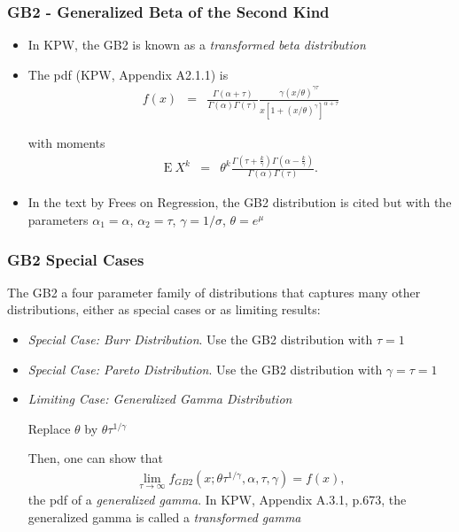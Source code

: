 \documentclass{beamer}
\begin{document}
\begin{frame}[shrink=2]
\frametitle{GB2 - Generalized Beta of the Second Kind}
\begin{itemize}
\item In KPW, the GB2 is known as a \textit{transformed beta
distribution} \vspace{2mm}

\item The pdf (KPW, Appendix A2.1.1) is
\begin{eqnarray*}
f(x) &=& \frac{\Gamma(\alpha + \tau)}{\Gamma(\alpha)\Gamma(\tau)}
   \frac{\gamma (x/\theta)^{\gamma \tau}}
   {x\left[1+(x/\theta)^{\gamma}\right]^{\alpha + \tau}}
\end{eqnarray*} \vspace{2mm}

with moments
\begin{eqnarray*}
\mathrm{E~}X^k &=& \theta^k \frac{\Gamma(\tau + \frac{k}{\gamma})\Gamma(\alpha-\frac{k}{\gamma})}{\Gamma(\alpha)\Gamma(\tau)} .
\end{eqnarray*} \vspace{2mm}

\item In the text by Frees on Regression, the GB2 distribution is cited but with the parameters
$\alpha_1  = \alpha$, $\alpha_2  =\tau$, $\gamma = 1/\sigma$,
$\theta = e^\mu$
\end{itemize}
\end{frame}

\begin{frame}[shrink=2]
\frametitle{GB2 Special Cases} The GB2 a four parameter family of
distributions that captures many other distributions, either as
special cases or as limiting results: \vspace{2mm}

\begin{itemize}
\item \textit{Special Case: Burr Distribution}. Use the GB2 distribution with $\tau =
1$ \vspace{2mm}

\item \textit{Special Case: Pareto Distribution}. Use the GB2 distribution with $\gamma=\tau =
1$ \vspace{2mm}

\item \textit{Limiting Case: Generalized Gamma Distribution} \vspace{2mm}

Replace $\theta$ by $\theta \tau^{1/\gamma}$ \vspace{2mm}

Then, one can show that
\begin{eqnarray*}
\lim_{\tau \to \infty} f_{GB2}(x; \theta \tau^{1/\gamma}, \alpha, \tau, \gamma) = f(x),
\end{eqnarray*}
the pdf of a \textit{generalized gamma}. In KPW, Appendix A.3.1,
p.673, the generalized gamma is called a \emph{transformed gamma}
\end{itemize}
\end{frame}
\end{document}
